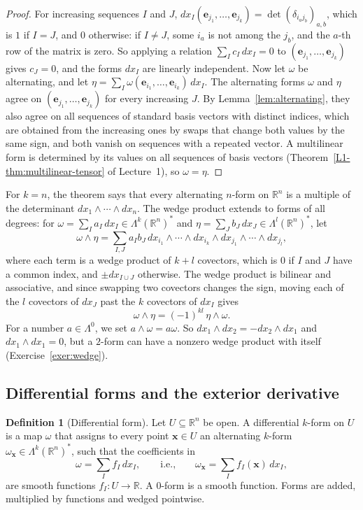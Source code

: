 \documentclass[11pt]{article}
\theoremstyle{definition}
\newtheorem{definition}{Definition}[section]
\theoremstyle{plain}
\theoremstyle{remark}
\begin{document}
\begin{proof}
    For increasing sequences $I$ and $J$, $dx_I(\mathbf{e}_{j_1}, \ldots, \mathbf{e}_{j_k}) = \det(\delta_{i_aj_b})_{a,b}$, which is $1$ if $I = J$, and $0$ otherwise: if $I \neq J$, some $i_a$ is not among the $j_b$, and the $a$-th row of the matrix is zero. So applying a relation $\sum_I c_I\, dx_I = 0$ to $(\mathbf{e}_{j_1}, \ldots, \mathbf{e}_{j_k})$ gives $c_J = 0$, and the forms $dx_I$ are linearly independent. Now let $\omega$ be alternating, and let $\eta = \sum_I \omega(\mathbf{e}_{i_1}, \ldots, \mathbf{e}_{i_k})\, dx_I$. The alternating forms $\omega$ and $\eta$ agree on $(\mathbf{e}_{j_1}, \ldots, \mathbf{e}_{j_k})$ for every increasing $J$. By Lemma~\ref{lem:alternating}, they also agree on all sequences of standard basis vectors with distinct indices, which are obtained from the increasing ones by swaps that change both values by the same sign, and both vanish on sequences with a repeated vector. A multilinear form is determined by its values on all sequences of basis vectors (Theorem~\ref{L1-thm:multilinear-tensor} of Lecture~1), so $\omega = \eta$.
\end{proof}

For $k = n$, the theorem says that every alternating $n$-form on $\mathbb{R}^n$ is a multiple of the determinant $dx_1 \wedge \cdots \wedge dx_n$. The wedge product extends to forms of all degrees: for $\omega = \sum_I a_I\, dx_I \in \Lambda^k(\mathbb{R}^n)^*$ and $\eta = \sum_J b_J\, dx_J \in \Lambda^l(\mathbb{R}^n)^*$, let
\[\omega \wedge \eta = \sum_{I, J} a_I b_J\, dx_{i_1} \wedge \cdots \wedge dx_{i_k} \wedge dx_{j_1} \wedge \cdots \wedge dx_{j_l},\]
where each term is a wedge product of $k + l$ covectors, which is $0$ if $I$ and $J$ have a common index, and $\pm dx_{I \cup J}$ otherwise. The wedge product is bilinear and associative, and since swapping two covectors changes the sign, moving each of the $l$ covectors of $dx_J$ past the $k$ covectors of $dx_I$ gives
\[\omega \wedge \eta = (-1)^{kl}\, \eta \wedge \omega.\]
For a number $a \in \Lambda^0$, we set $a \wedge \omega = a\omega$. So $dx_1 \wedge dx_2 = -dx_2 \wedge dx_1$ and $dx_1 \wedge dx_1 = 0$, but a $2$-form can have a nonzero wedge product with itself (Exercise~\ref{exer:wedge}).

\subsection{Differential forms and the exterior derivative}

\begin{definition}[Differential form]\label{def:differential-form}
    Let $U \subseteq \mathbb{R}^n$ be open. A differential $k$-form on $U$ is a map $\omega$ that assigns to every point $\mathbf{x} \in U$ an alternating $k$-form $\omega_{\mathbf{x}} \in \Lambda^k(\mathbb{R}^n)^*$, such that the coefficients in
    \[\omega = \sum_I f_I\, dx_I, \qquad \text{i.e.,} \qquad \omega_{\mathbf{x}} = \sum_I f_I(\mathbf{x})\, dx_I,\]
    are smooth functions $f_I: U \to \mathbb{R}$. A $0$-form is a smooth function. Forms are added, multiplied by functions and wedged pointwise.
\end{definition}
\end{document}
